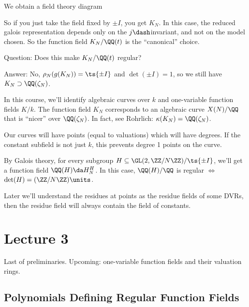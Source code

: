 We obtain a field theory diagram

\begin{center}
\end{center}

So if you just take the field fixed by \(\pm I\), you get \(K_N\). In
this case, the reduced galois representation depends only on the
\(j\dash\)invariant, and not on the model chosen. So the function field
\(K_N/\QQ(t)\) is the ``canonical'' choice.

Question: Does this make \(K_N/\QQ(t)\) regular?

Answer: No, \(\rho_N(g(K_N)) = \ts{\pm I}\) and \(\det(\pm I) = 1\), so
we still have \(K_N \supset \QQ(\zeta_N)\).

In this course, we'll identify algebraic curves over \(k\) and
one-variable function fields \(K/k\). The function field \(K_N\)
corresponds to an algebraic curve \(X(N)/\QQ\) that is ``nicer'' over
\(\QQ(\zeta_N)\). In fact, see Rohrlich: \(\kappa(K_N) = \QQ(\zeta_N)\).

Our curves will have points (equal to valuations) which will have
degrees. If the constant subfield is not just \(k\), this prevents
degree 1 points on the curve.

By Galois theory, for every subgroup
\(H \subseteq \GL(2, \ZZ/N\ZZ) / \ts{\pm I}\), we'll get a function
field \(\QQ(H) \da H_N^H\). In this case, \(\QQ(H)/\QQ\) is regular
\(\iff\) \(\det(H) = (\ZZ/N\ZZ)\units\).

Later we'll understand the residues at points as the residue fields of
some DVRs, then the residue field will always contain the field of
constants.

\hypertarget{lecture-3}{%
\section{Lecture 3}\label{lecture-3}}

Last of preliminaries. Upcoming: one-variable function fields and their
valuation rings.

\hypertarget{polynomials-defining-regular-function-fields}{%
\subsection{Polynomials Defining Regular Function
Fields}\label{polynomials-defining-regular-function-fields}}

